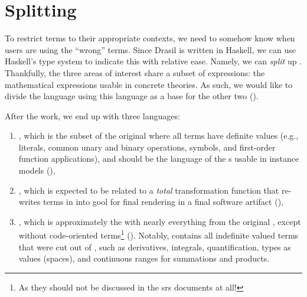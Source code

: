 \section{Splitting}
\label{chap:lang-division:sec:splitting}

To restrict terms to their appropriate contexts, we need to somehow know when
users are using the ``wrong'' terms. Since Drasil is written in Haskell, we can
use Haskell's type system to indicate this with relative ease. Namely, we can
\textit{split} up \Expr{}. Thankfully, the three areas of interest share a
subset of expressions: the mathematical expressions usable in concrete theories.
As such, we would like to divide the language using this language as a base for
the other two ().

\languageDivision{}

After the work, we end up with three languages:

\begin{enumerate}

    \item \Expr{}, which is the subset of the original \Expr{} where all terms
          have definite values (e.g., literals, common unary and binary
          operations, symbols, and first-order function applications), and
          should be the language of the \QDefinition{}s usable in instance
          models (),
    
    \item \CodeExpr{}, which is expected to be related to a \textit{total}
          transformation function that re-writes terms in \CodeExpr{} into
          \acs{gool} for final rendering in a final software artifact
          (),

    \item  \ModelExpr{}, which is approximately the \Expr{} with nearly
          everything from the original \Expr{}, except without code-oriented
          terms\footnote{As they should not be discussed in the \acs{srs}
          documents at all!} (). Notably,
          \ModelExpr{} contains all indefinite valued terms that were cut out of
          \Expr{}, such as derivatives, integrals, quantification, types as
          values (spaces), and continuous ranges for summations and products.

\end{enumerate}

